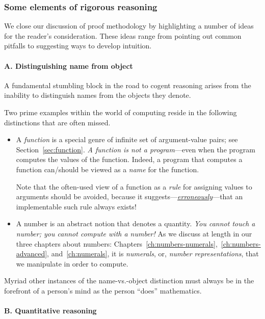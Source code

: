 \subsubsection{Some elements of rigorous reasoning}
\label{sec:elements-of-reasoning}

We close our discussion of proof methodology by highlighting a number
of ideas for the reader's consideration.  These ideas range from
pointing out common pitfalls to suggesting ways to develop intuition.

\medskip

\paragraph{\small\sf A. Distinguishing name from object}

A fundamental stumbling block in the road to cogent reasoning arises
from the inability to distinguish names from the objects they denote.

Two prime examples within the world of computing reside in the
following distinctions that are often missed.
\begin{itemize}
\item
A {\it function} is a special genre of infinite set of argument-value
pairs; see Section~\ref{sec:function}.  {\em A function is not a
  program}---even when the program computes the values of the
function.  Indeed, a program that computes a function can/should be
viewed as a {\it name} for the function.

Note that the often-used view of a function as a {\em rule} for
assigning values to arguments should be avoided, because it
suggests---\underline{\em erroneously}---that an implementable such
rule always exists!

\item
A number is an abstract notion that denotes a quantity.  {\em You
  cannot touch a number; you cannot compute with a number!}  As we
discuss at length in our three chapters about numbers:
Chapters~\ref{ch:numbers-numerals},~\ref{ch:numbers-advanced},
and~\ref{ch:numerals}, it is {\em numerals}, or, {\em number
  representations}, that we manipulate in order to compute.
\end{itemize}
Myriad other instances of the name-vs.-object distinction must always
be in the forefront of a person's mind as the person ``does''
mathematics.

\medskip

\paragraph{\small\sf B. Quantitative reasoning}

